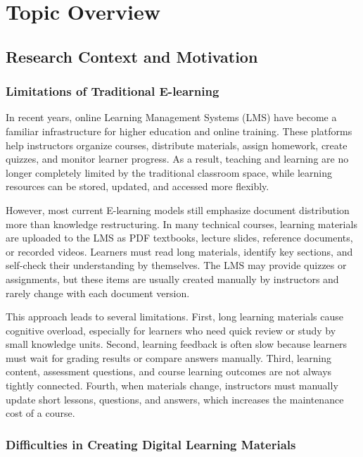 \chapter{Topic Overview}

\section{Research Context and Motivation}

\subsection{Limitations of Traditional E-learning}

In recent years, online Learning Management Systems (LMS) have become a
familiar infrastructure for higher education and online training. These
platforms help instructors organize courses, distribute materials, assign
homework, create quizzes, and monitor learner progress. As a result, teaching
and learning are no longer completely limited by the traditional classroom
space, while learning resources can be stored, updated, and accessed more
flexibly.

However, most current E-learning models still emphasize document distribution
more than knowledge restructuring. In many technical courses, learning
materials are uploaded to the LMS as PDF textbooks, lecture slides, reference
documents, or recorded videos. Learners must read long materials, identify key
sections, and self-check their understanding by themselves. The LMS may provide
quizzes or assignments, but these items are usually created manually by
instructors and rarely change with each document version.

This approach leads to several limitations. First, long learning materials
cause cognitive overload, especially for learners who need quick review or
study by small knowledge units. Second, learning feedback is often slow because
learners must wait for grading results or compare answers manually. Third,
learning content, assessment questions, and course learning outcomes are not
always tightly connected. Fourth, when materials change, instructors must
manually update short lessons, questions, and answers, which increases the
maintenance cost of a course.

\subsection{Difficulties in Creating Digital Learning Materials}

